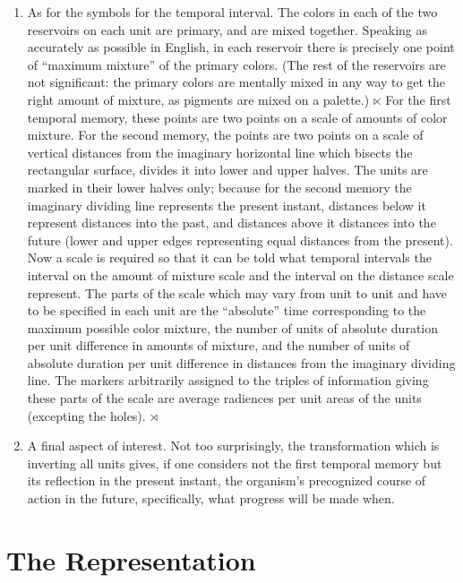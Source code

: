 \begin{enumerate}[wide, nosep, itemsep=0.5em]
\item As for the symbols for the temporal interval. The colors in each of 
the two reservoirs on each unit are primary, and are mixed together. 
Speaking as accurately as possible in English, in each reservoir there is 
precisely one point of \enquote{maximum mixture} of the primary colors. (The rest 
of the reservoirs are not significant: the primary colors are mentally mixed in 
any way to get the right amount of mixture, as pigments are mixed on a 
palette.) $\ltimes$ For the first temporal memory, these points are two points on a 
scale of amounts of color mixture. For the second memory, the points are 
two points on a scale of vertical distances from the imaginary horizontal line 
which bisects the rectangular surface, divides it into lower and upper halves. 
The units are marked in their lower halves only; because for the second 
memory the imaginary dividing line represents the present instant, distances 
below it represent distances into the past, and distances above it distances 
into the future (lower and upper edges representing equal distances from the 
present). Now a scale is required so that it can be told what temporal 
intervals the interval on the amount of mixture scale and the interval on the 
distance scale represent. The parts of the scale which may vary from unit to 
unit and have to be specified in each unit are the \enquote{absolute} time 
corresponding to the maximum possible color mixture, the number of units 
of absolute duration per unit difference in amounts of mixture, and the 
number of units of absolute duration per unit difference in distances from 
the imaginary dividing line. The markers arbitrarily assigned to the triples of 
information giving these parts of the scale are average radiences per unit 
areas of the units (excepting the holes). $\rtimes$

\item A final aspect of interest. Not too surprisingly, the transformation 
which is inverting all units gives, if one considers not the first temporal 
memory but its reflection in the present instant, the organism's precognized 
course of action in the future, specifically, what progress will be made when. 
\end{enumerate}


\section*{The Representation}


